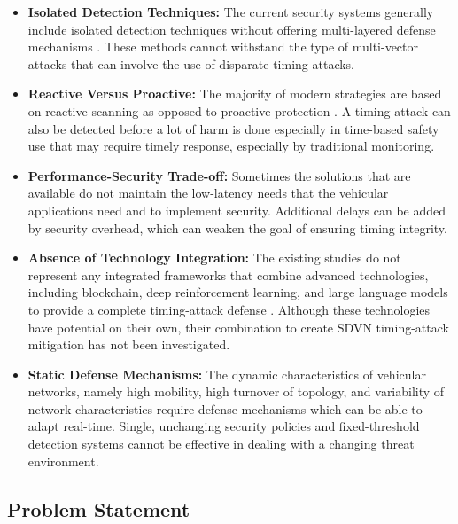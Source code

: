 \begin{itemize}
    \item \textbf{Isolated Detection Techniques:} The current security systems generally include isolated detection techniques without offering multi-layered defense mechanisms \cite{Shoaib2023Detection}. These methods cannot withstand the type of multi-vector attacks that can involve the use of disparate timing attacks.
    
    \item \textbf{Reactive Versus Proactive:} The majority of modern strategies are based on reactive scanning as opposed to proactive protection \cite{Kanimozhi2022DRL}. A timing attack can also be detected before a lot of harm is done especially in time-based safety use that may require timely response, especially by traditional monitoring.
    
    \item \textbf{Performance-Security Trade-off:} Sometimes the solutions that are available do not maintain the low-latency needs that the vehicular applications need and to implement security. Additional delays can be added by security overhead, which can weaken the goal of ensuring timing integrity.
    
    \item \textbf{Absence of Technology Integration:} The existing studies do not represent any integrated frameworks that combine advanced technologies, including blockchain, deep reinforcement learning, and large language models to provide a complete timing-attack defense \cite{Mozumder2020Blockchain, Kanimozhi2022DRL, Zhang2024LLM}. Although these technologies have potential on their own, their combination to create SDVN timing-attack mitigation has not been investigated.
    
    \item \textbf{Static Defense Mechanisms:} The dynamic characteristics of vehicular networks, namely high mobility, high turnover of topology, and variability of network characteristics require defense mechanisms which can be able to adapt real-time. Single, unchanging security policies and fixed-threshold detection systems cannot be effective in dealing with a changing threat environment.
\end{itemize}

\subsection{Problem Statement}

